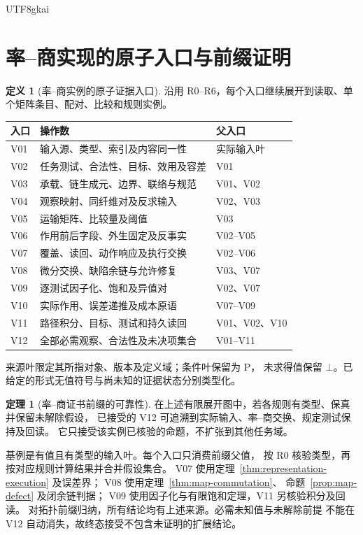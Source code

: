 \documentclass[12pt]{report}
\makeatletter
\theoremstyle{definition}
\newtheorem{definition}{定义}[chapter]
\newtheorem{theorem}{定理}[chapter]
\renewenvironment{proof}[1][\proofname]{\par
  \pushQED{\qed}\normalfont
  \topsep6\p@\@plus6\p@\relax
  \trivlist
  \item[\hskip\labelsep\normalfont #1\@addpunct{.}]\ignorespaces
}{
  \popQED\endtrivlist\@endpefalse
}
\makeatother
\begin{document}
\begin{CJK*}{UTF8}{gkai}
\section{率--商实现的原子入口与前缀证明}
\begin{definition}[率--商实例的原子证据入口]
\label{def:comparison-atoms}
沿用 R0--R6，每个入口继续展开到读取、单个矩阵条目、配对、比较和规则实例。
\begin{center}\small
\begin{tabular}{p{}p{}p{}}
\toprule 入口 & 操作数 & 父入口\\\midrule
V01 & 输入源、类型、索引及内容同一性 & 实际输入叶\\
V02 & 任务测试、合法性、目标、效用及容差 & V01\\
V03 & 承载、链生成元、边界、联络与规范 & V01、V02\\
V04 & 观察映射、同纤维对及反求输入 & V02、V03\\
V05 & 运输矩阵、比较量及阈值 & V03\\
V06 & 作用前后字段、外生固定及反事实 & V02--V05\\
V07 & 覆盖、读回、动作响应及执行交换 & V02--V06\\
V08 & 微分交换、缺陷余链与允许修复 & V03、V07\\
V09 & 逐测试因子化、饱和及异值对 & V02、V07\\
V10 & 实际作用、误差递推及成本原语 & V07--V09\\
V11 & 路径积分、目标、测试和持久读回 & V01、V02、V10\\
V12 & 全部必需观察、合法性及未决项集合 & V01--V11\\
\bottomrule
\end{tabular}
\end{center}
来源叶限定其所指对象、版本及定义域；条件叶保留为 P，
未求得值保留 \(\bot\)。已给定的形式无值符号与尚未知的证据状态分别类型化。
\end{definition}
\begin{theorem}[率--商证书前缀的可靠性]
\label{thm:comparison-prefix}
在上述有限展开图中，若各规则有类型、保真并保留未解除假设，
已接受的 V12 可追溯到实际输入、率--商交换、规定测试保持及回读。
它只接受该实例已核验的命题，不扩张到其他任务域。
\end{theorem}
\begin{proof}
基例是有值且有类型的输入叶。每个入口只消费前缀父值，
按 R0 核验类型，再按对应规则计算结果并合并假设集合。
V07 使用定理~\ref{thm:representation-execution} 及误差界；
V08 使用定理~\ref{thm:map-commutation}、
命题~\ref{prop:map-defect} 及闭余链判据；
V09 使用因子化与有限饱和定理，V11 另核验积分及回读。
对拓扑前缀归纳，所有结论均有上述来源。必需未知值与未解除前提
不能在 V12 自动消失，故终态接受不包含未证明的扩展结论。
\end{proof}


\end{CJK*}
\end{document}
